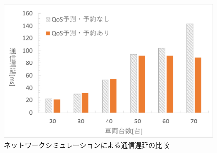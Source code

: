 \documentclass[a4paper,10pt,twocolumn,uplatex]{jsarticle}
\begin{document}
\begin{figure}[t]
	\begin{centering}
    \includegraphics[width=\linewidth]{img/Delay_Resume.pdf}
    \caption{ネットワークシミュレーションによる通信遅延の比較}
    \label{fig:Delay}
    \end{centering}
\end{figure}


\end{document}
